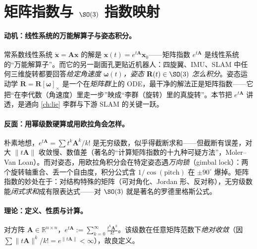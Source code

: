 \section{矩阵指数与 \texorpdfstring{$\SO(3)$}{SO(3)} 指数映射}
\label{sec:ode-expm}

\paragraph{动机：线性系统的万能解算子与姿态积分。}
常系数线性系统 $\dot{\mathbf{x}}=\mathbf{A}\mathbf{x}$ 的解是 $\mathbf{x}(t)=e^{t\mathbf{A}}\mathbf{x}_0$——矩阵指数 $e^{t\mathbf{A}}$ 是线性系统的“万能解算子”。而它的另一副面孔更贴近机器人：四旋翼、IMU、SLAM 中任何三维旋转都要回答\emph{给定角速度 $\boldsymbol{\omega}(t)$，姿态 $\mathbf{R}(t)\in\SO(3)$ 怎么积分}。姿态运动学 $\dot{\mathbf{R}}=\mathbf{R}[\boldsymbol{\omega}]_\times$ 是一个在\emph{矩阵群}上的 ODE，最干净的解法正是矩阵指数——它把“在李代数（角速度）里走一步”映成“李群（旋转）里的真旋转”。本节把 $e^{t\mathbf{A}}$ 讲透，是通向 \cref{ch:lie} 李群与下游 SLAM 的关键一跃。

\paragraph{反面：用幂级数硬算或用欧拉角会怎样。}
朴素地想，$e^{t\mathbf{A}}=\sum t^k\mathbf{A}^k/k!$ 是无穷级数，似乎得截断求和——但截断有误差，对大 $\|t\mathbf{A}\|$ 收敛慢、数值差（著名的“计算矩阵指数的十九种可疑方法”，Moler--Van Loan）。而对姿态，用欧拉角积分会在特定姿态遇\emph{万向锁}（gimbal lock）：两个旋转轴重合、丢一个自由度，积分公式含 $1/\cos(\text{pitch})$ 在 $\pm90^\circ$ 爆掉。矩阵指数的妙处在于：对结构特殊的矩阵（可对角化、Jordan 形、反对称），无穷级数能\emph{闭式求和}成有限表达式——对 $\SO(3)$ 就是著名的罗德里格斯公式。

\paragraph{理论：定义、性质与计算。}

\begin{definition}[矩阵指数]\label{def:matrix-exp}
对方阵 $\mathbf{A}\in\mathbb{R}^{n\times n}$，$e^{t\mathbf{A}}:=\sum_{k=0}^\infty\frac{t^k\mathbf{A}^k}{k!}$。该级数在任意矩阵范数下\emph{绝对收敛}（因 $\sum\|t\mathbf{A}\|^k/k!=e^{\|t\mathbf{A}\|}<\infty$），故良定义。
\end{definition}

